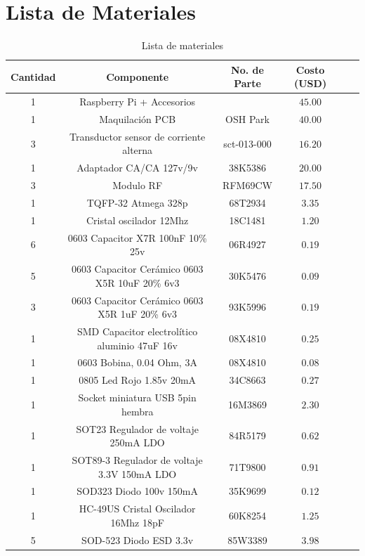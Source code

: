 


\chapter{ Lista de Materiales }

\begin{table}[H]
  \centering
  \begin{tabular}{ c c c c c c }
    \hline\hline
    Cantidad & Componente & No. de Parte&  Costo (USD)\\
    \hline

1 & Raspberry Pi + Accesorios & &$45.00$ \\
1 & Maquilación PCB & OSH Park&  $40.00$ \\
3 & Transductor sensor de corriente alterna &sct-013-000&  $16.20$ \\
1 & Adaptador CA/CA 127v/9v &38K5386 &$20.00$ \\
3 & Modulo RF  &RFM69CW& $17.50$ \\
1 & TQFP-32 Atmega 328p  & 68T2934 &$3.35$ \\
1 & Cristal oscilador 12Mhz & 18C1481 &$1.20$ \\
6 & 0603 Capacitor X7R 100nF 10\% 25v & 06R4927 &$0.19$ \\
5& 0603 Capacitor Cerámico 0603 X5R 10uF 20\% 6v3 & 30K5476&$0.09$ \\
3& 0603 Capacitor Cerámico 0603 X5R 1uF 20\% 6v3 & 93K5996  &$0.19$ \\
1& SMD Capacitor electrolítico aluminio 47uF 16v & 08X4810 &$0.25$ \\
1& 0603 Bobina, 0.04 Ohm, 3A &08X4810 & $0.08$ \\
1& 0805 Led Rojo 1.85v 20mA & 34C8663 & $0.27$ \\
1& Socket miniatura USB 5pin hembra & 16M3869 &$2.30$ \\
1& SOT23 Regulador de voltaje 250mA LDO & 84R5179 & $0.62$ \\
1& SOT89-3 Regulador de voltaje 3.3V 150mA LDO & 71T9800  &$0.91$ \\
1& SOD323 Diodo 100v 150mA & 35K9699 & $0.12$ \\
1& HC-49US Cristal Oscilador 16Mhz 18pF & 60K8254 & $1.25$ \\
5& SOD-523 Diodo ESD 3.3v & 85W3389 & $3.98$ \\
    \hline
  \end{tabular}
 \caption{Lista de materiales }
\end{table}
\newpage

